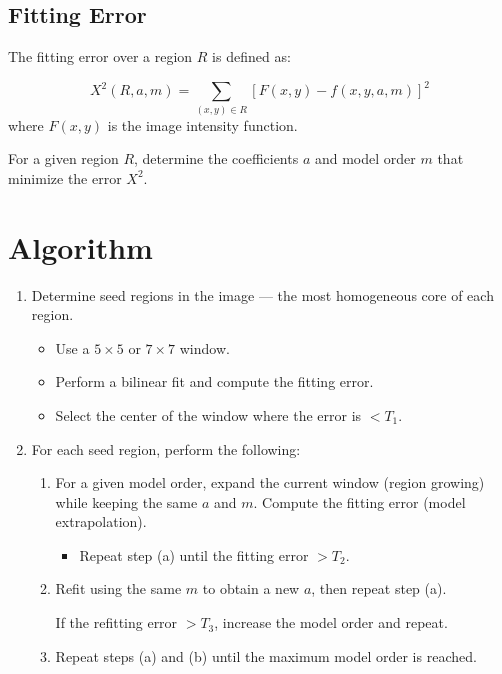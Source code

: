 \documentclass[11pt]{article}
\theoremstyle{definition}
\begin{document}
\subsection*{Fitting Error}

The fitting error over a region $R$ is defined as:
\begin{shaded}
\begin{equation}
X^2(R, a, m) 
= \sum_{(x,y)\in R} 
\left[ F(x, y) - f(x, y, a, m) \right]^2
\end{equation}
\noindent
where $F(x, y)$ is the image intensity function.
\vspace{0.3cm}

For a given region $R$, determine the coefficients $a$ and model order $m$ that minimize the error $X^2$.

\end{shaded}



\section*{Algorithm}

\begin{enumerate}
    \item Determine seed regions in the image — the most homogeneous core of each region.
    
    \begin{itemize}
        \item Use a $5 \times 5$ or $7 \times 7$ window.
        \item Perform a bilinear fit and compute the fitting error.
        \item Select the center of the window where the error is $< T_1$.
    \end{itemize}

    \item For each seed region, perform the following:

    \begin{enumerate}
        \item[(a)] For a given model order, expand the current window (region growing) 
        while keeping the same \underline{\textbf{$a$}} and \underline{\textbf{$m$}}. 
        Compute the fitting error (model extrapolation).
        
        \begin{itemize}
            \item Repeat step (a) until the fitting error $> T_2$.
        \end{itemize}

        \item[(b)] Refit using the same $m$ to obtain a new $a$, then repeat step (a). 
        
        If the refitting error $> T_3$, increase the model order and repeat.

        \item[(c)] Repeat steps (a) and (b) until the maximum model order is reached.
    \end{enumerate}
\end{enumerate}
\end{document}
